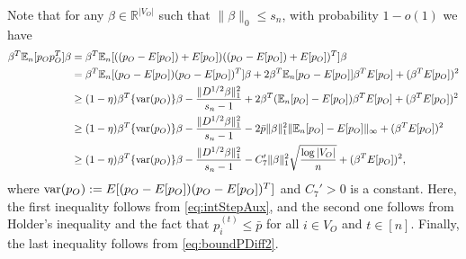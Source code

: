 \documentclass[opre,nonblindrev]{informs3} %
\def\En{{\mathbb{E}_n}}
\begin{document}
\begin{APPENDIX}{}
Note that for any $\beta \in \mathbb{R}^{|V_O|}$
such that $\|\beta\|_0\leq s_n$,
with probability $1-o(1)$
we have
\begin{equation} \label{eq:firstBoundPo}
\begin{aligned}
\beta^T\En[p_Op_O^T]\beta & = \beta^T
\En[((p_O-E[p_O]) +E[p_O]) ((p_O-E[p_O]) +E[p_O])^T] \beta\\
& = \beta^T\En[(p_O-E[p_O])(p_O-E[p_O])^T]\beta+2\beta^T\En[p_O-E[p_O]]\beta^TE[p_O]+(\beta^TE[p_O])^2\\
& \geq (1-\eta)\beta^T\{{\rm var}(p_O)\}\beta - \frac{\|D^{1/2}\beta\|_1^2}{s_n-1} + 2\beta^T(\En[p_O]-E[p_O])\beta^TE[p_O]+(\beta^TE[p_O])^2\\
& \geq (1-\eta)\beta^T\{{\rm var}(p_O)\}\beta - \frac{\|D^{1/2}\beta\|_1^2}{s_n-1} -2 \bar{p} \|\beta\|_1^2\|\En[p_O]-E[p_O]\|_\infty +(\beta^TE[p_O])^2\\
& \geq (1-\eta)\beta^T\{{\rm var}(p_O)\}\beta - \frac{\|D^{1/2}\beta\|_1^2}{s_n-1}-C'_7\|\beta\|_1^2
\sqrt{\frac{\log |V_O|}{n}}
+(\beta^TE[p_O])^2,
\end{aligned}
\end{equation}
where
${\rm var}  (p_O):= E[(p_O-E[p_O])(p_O-E[p_O])^T]$
and $C_7'>0$ is a constant. Here,
the first inequality follows from \eqref{eq:intStepAux}, and
the second one follows from Holder's inequality and the fact that $p_i^{(t)} \leq\bar{p}$ for all $i\in V_O$ and $t\in [n]$.
Finally, the
last inequality follows from \eqref{eq:boundPDiff2}.



\end{APPENDIX}
\end{document}
